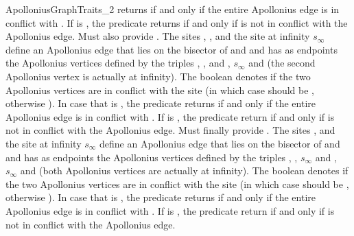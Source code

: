 \begin{ccRefConcept}{ApolloniusGraphTraits_2}
{returns  if and only if the entire Apollonius edge is in
conflict with . If  is , the predicate returns
 if and only if  is not in conflict with the
Apollonius edge.
%
Must also provide . The
sites , ,  and the site at infinity
$s_\infty$ define an Apollonius edge that lies on the bisector of
 and  and has as endpoints the Apollonius vertices
defined by the triples , ,  and ,
$s_\infty$ and  (the second Apollonius vertex is actually at
infinity). The boolean  denotes if the two Apollonius vertices
are in conflict with the site  (in which case 
should be , otherwise ). 
In case that  is , the predicate
returns  if and only if the entire Apollonius edge is in
conflict with . If  is , the predicate return 
 if and only if  is not in conflict with the
Apollonius edge.
%
Must finally provide . The
sites ,  and the site at infinity
$s_\infty$ define an Apollonius edge that lies on the bisector of
 and  and has as endpoints the Apollonius vertices
defined by the triples , , $s_\infty$ and ,
$s_\infty$ and  (both Apollonius vertices are actually at
infinity). The boolean  denotes if the two Apollonius vertices
are in conflict with the site  (in which case 
should be , otherwise ). 
In case that  is , the predicate
returns  if and only if the entire Apollonius edge is in
conflict with . If  is , the predicate return 
 if and only if  is not in conflict with the
Apollonius edge.}
%
\ccGlue
{}
\end{ccRefConcept}

